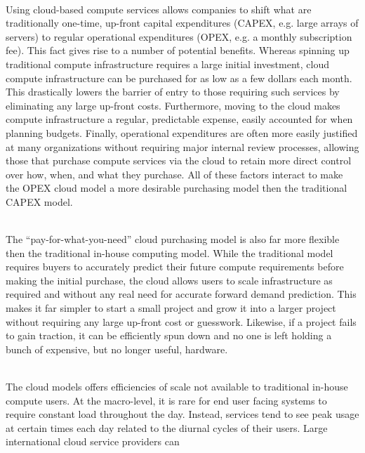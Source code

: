 \begin{packed_desc}
\item[OPEX vs CAPEX] \hfill \\ Using cloud-based compute services
  allows companies to shift what are traditionally one-time, up-front
  capital expenditures (CAPEX, e.g. large arrays of servers) to
  regular operational expenditures (OPEX, e.g. a monthly subscription
  fee). This fact gives rise to a number of potential
  benefits. Whereas spinning up traditional compute infrastructure
  requires a large initial investment, cloud compute infrastructure
  can be purchased for as low as a few dollars each month. This
  drastically lowers the barrier of entry to those requiring such
  services by eliminating any large up-front costs. Furthermore,
  moving to the cloud makes compute infrastructure a regular,
  predictable expense, easily accounted for when planning
  budgets. Finally, operational expenditures are often more easily
  justified at many organizations without requiring major internal
  review processes, allowing those that purchase compute services via
  the cloud to retain more direct control over how, when, and what
  they purchase. All of these factors interact to make the OPEX cloud
  model a more desirable purchasing model then the traditional CAPEX
  model.
\item[Flexibility] \hfill \\ The ``pay-for-what-you-need'' cloud
  purchasing model is also far more flexible then the traditional
  in-house computing model. While the traditional model requires
  buyers to accurately predict their future compute requirements
  before making the initial purchase, the cloud allows users to scale
  infrastructure as required and without any real need for accurate
  forward demand prediction. This makes it far simpler to start a
  small project and grow it into a larger project without requiring
  any large up-front cost or guesswork. Likewise, if a project fails
  to gain traction, it can be efficiently spun down and no one is left
  holding a bunch of expensive, but no longer useful, hardware.
\item[Efficiency] \hfill \\ The cloud models offers efficiencies of
  scale not available to traditional in-house compute users. At the
  macro-level, it is rare for end user facing systems to require
  constant load throughout the day. Instead, services tend to see peak
  usage at certain times each day related to the diurnal cycles of
  their users. Large international cloud service providers can

\end{packed_desc}
